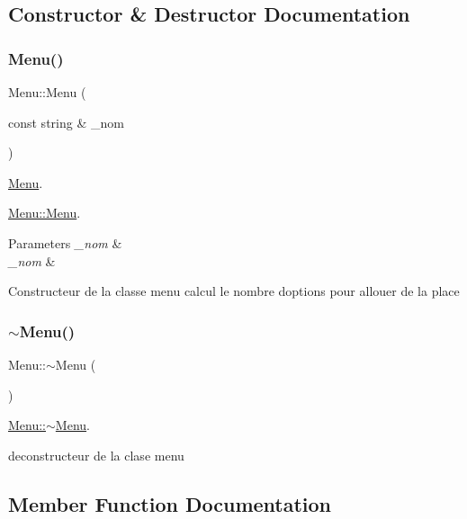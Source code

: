 \subsection{Constructor \& Destructor Documentation}
\mbox{\label{class_menu_a2733b73d7c4dff4b1db19afd45f255b9}} 
\subsubsection{\texorpdfstring{Menu()}{Menu()}}
{\footnotesize\ttfamily Menu\+::\+Menu (\begin{DoxyParamCaption}\item[{const string \&}]{\+\_\+nom }\end{DoxyParamCaption})}



\hyperlink{class_menu}{Menu}. 

\hyperlink{class_menu_a2733b73d7c4dff4b1db19afd45f255b9}{Menu\+::\+Menu}.


\begin{DoxyParams}{Parameters}
{\em \+\_\+nom} & \\
\hline
{\em \+\_\+nom} & \\
\hline
\end{DoxyParams}
Constructeur de la classe menu calcul le nombre d\textquotesingle{}options pour allouer de la place \mbox{\label{class_menu_a831387f51358cfb88cd018e1777bc980}} 
\subsubsection{\texorpdfstring{$\sim$\+Menu()}{~Menu()}}
{\footnotesize\ttfamily Menu\+::$\sim$\+Menu (\begin{DoxyParamCaption}{ }\end{DoxyParamCaption})}



\hyperlink{class_menu_a831387f51358cfb88cd018e1777bc980}{Menu\+::$\sim$\+Menu}. 

deconstructeur de la clase menu 

\subsection{Member Function Documentation}
\mbox{\label{class_menu_a079e0c6a24248a07993b48b310ba65ce}} 
